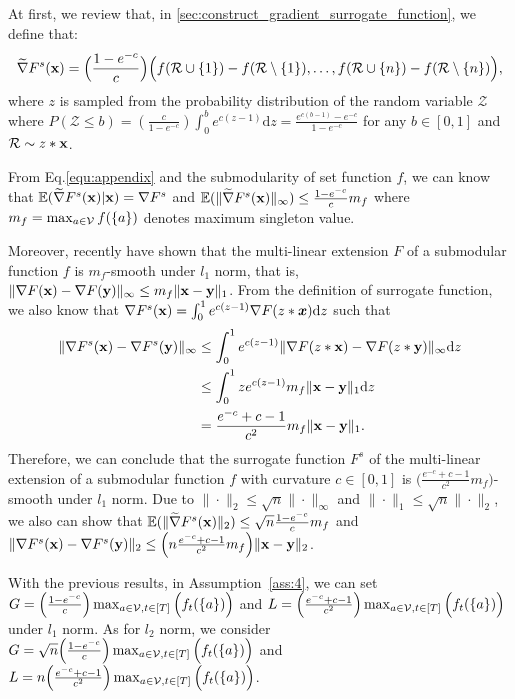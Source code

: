 At first, we review that, in \cref{sec:construct_gradient_surrogate_function}, we define that:
\begin{equation}\label{equ:appendix}\widetilde{\nabla}F^{s}(\mathbf{x})=\Big(\frac{1-e^{-c}}{c}\Big)\Big(f(\mathcal{R}\cup\{1\})-f(\mathcal{R}\setminus\{1\}),\dots,f(\mathcal{R}\cup\{n\})-f(\mathcal{R}\setminus\{n\})\Big),
\end{equation}where $z$ is sampled from the probability distribution of the random variable $\mathcal{Z}$ where $P(\mathcal{Z}\le b)=(\frac{c}{1-e^{-c}})\int_{0}^{b}e^{c(z-1)}\mathrm{d}z=\frac{e^{c(b-1)}-e^{-c}}{1-e^{-c}}$ for any $b\in[0,1]$  and $\mathcal{R}\sim z*\mathbf{x}$. 

From Eq.\eqref{equ:appendix} and the submodularity of set function $f$, we can know that  $\mathbb{E}(\widetilde{\nabla}F^{s}(\mathbf{x})|\mathbf{x})=\nabla F^{s}$ and $\mathbb{E}(\|\widetilde{\nabla}F^{s}(\mathbf{x})\|_{\infty})\le\frac{1-e^{-c}}{c}m_{f}$ where $m_{f}=\max_{a\in\mathcal{V}}f(\{a\})$ denotes maximum singleton value.

Moreover, \citet{hassani2017gradient} recently have shown that the multi-linear extension $F$ of a submodular function $f$ is $m_{f}$-smooth under $l_{1}$ norm, that is, $\|\nabla F(\mathbf{x})-\nabla F(\mathbf{y})\|_{\infty}\le m_{f}\|\mathbf{x}-\mathbf{y}\|_{1}$. From the definition of surrogate function, we also know that $\nabla F^{s}(\mathbf{x})=\int_{0}^{1}e^{c(z-1)}\nabla F(z*\boldsymbol{x})\mathrm{d}z$ such that 
\begin{equation*}
    \begin{aligned}
        \|\nabla F^{s}(\mathbf{x})-\nabla F^{s}(\mathbf{y})\|_{\infty}&\le\int_{0}^{1}e^{c(z-1)}\|\nabla F(z*\mathbf{x})-\nabla F(z*\mathbf{y})\|_{\infty}\mathrm{d}z\\
        &\le\int_{0}^{1}ze^{c(z-1)}m_{f}\|\mathbf{x}-\mathbf{y}\|_{1}\mathrm{d}z\\
        &=\frac{e^{-c}+c-1}{c^{2}}m_{f}\|\mathbf{x}-\mathbf{y}\|_{1}.
    \end{aligned}
\end{equation*}
Therefore, we can conclude that the surrogate function $F^{s}$ of the multi-linear extension of a submodular function $f$ with curvature $c\in[0,1]$ is $\Big(\frac{e^{-c}+c-1}{c^{2}}m_{f}\Big)$-smooth  under $l_{1}$ norm. Due to $\|\cdot\|_{2}\le\sqrt{n}\|\cdot\|_{\infty}$ and $\|\cdot\|_{1}\le\sqrt{n}\|\cdot\|_{2}$, we also can show that $\mathbb{E}(\|\widetilde{\nabla}F^{s}(\mathbf{x})\|_{2})\le\sqrt{n}\frac{1-e^{-c}}{c}m_{f}$ and $  \|\nabla F^{s}(\mathbf{x})-\nabla F^{s}(\mathbf{y})\|_{2}\le\Big(n\frac{e^{-c}+c-1}{c^{2}}m_{f}\Big)\|\mathbf{x}-\mathbf{y}\|_{2}$.

With the previous results, in Assumption~\ref{ass:4}, we can set $G=\Big(\frac{1-e^{-c}}{c}\Big)\max_{a\in\mathcal{V},t\in[T]}\Big(f_{t}(\{a\})\Big)$ and $L=\Big(\frac{e^{-c}+c-1}{c^{2}}\Big)\max_{a\in\mathcal{V},t\in[T]}\Big(f_{t}(\{a\})\Big)$ under $l_{1}$ norm. As for $l_{2}$ norm, we consider $G=\sqrt{n}\Big(\frac{1-e^{-c}}{c}\Big)\max_{a\in\mathcal{V},t\in[T]}\Big(f_{t}(\{a\})\Big)$ and $L=n\Big(\frac{e^{-c}+c-1}{c^{2}}\Big)\max_{a\in\mathcal{V},t\in[T]}\Big(f_{t}(\{a\})\Big)$.

